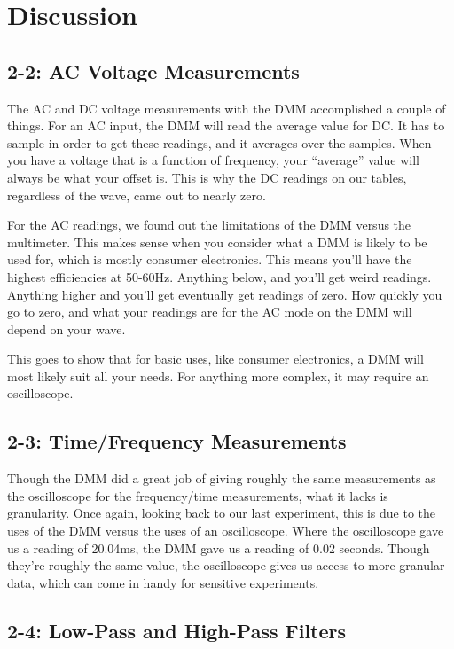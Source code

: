 \documentclass[%
 aip,
 jmp,
 amsmath,
 amssymb,
 reprint,%
 numerical,
 longbibliography,
]{revtex4-1}
\begin{document}
\section{Discussion} \label{Section:Discussion}
	
	\subsection{2-2: AC Voltage Measurements}
	
	The AC and DC voltage measurements with the DMM accomplished a couple of things.
	For an AC input, the DMM will read the average value for DC. It has to sample
	in order to get these readings, and it averages over the samples. When you have
	a voltage that is a function of frequency, your "`average"' value will always be
	what your offset is. This is why the DC readings on our tables, regardless of the
	wave, came out to nearly zero.
	
	For the AC readings, we found out the limitations of the DMM versus the multimeter.
	This makes sense when you consider what a DMM is likely to be used for, which is mostly
	consumer electronics. This means you'll have the highest efficiencies at 50-60Hz. Anything
	below, and you'll get weird readings. Anything higher and you'll get eventually get readings
	of zero. How quickly you go to zero, and what your readings are for the AC mode on the DMM
	will depend on your wave.
	
	This goes to show that for basic uses, like consumer electronics, a DMM will most likely
	suit all your needs. For anything more complex, it may require an oscilloscope.
	
	\subsection{2-3: Time/Frequency Measurements}
	
	Though the DMM did a great job of giving roughly the same measurements as the oscilloscope
	for the frequency/time measurements, what it lacks is granularity. Once again, looking back
	to our last experiment, this is due to the uses of the DMM versus the uses of an 
	oscilloscope. Where the oscilloscope gave us a reading of 20.04ms, the DMM gave us a reading
	of 0.02 seconds. Though they're roughly the same value, the oscilloscope gives us access
	to more granular data, which can come in handy for sensitive experiments.
	
	\subsection{2-4: Low-Pass and High-Pass Filters}
	
\end{document}
